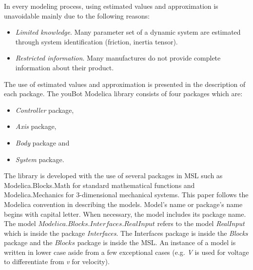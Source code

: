 In every modeling process, using estimated values and approximation is unavoidable mainly due to the following reasons:
\begin{itemize}
\item \emph{Limited knowledge}. 
Many parameter set of a dynamic system are estimated through system identification (friction, inertia tensor).
\item \emph{Restricted information}. 
Many manufactures do not provide complete information about their product.
\end{itemize}
The use of estimated values and approximation is presented in the description of each package.
The youBot Modelica library consists of four packages which are:
\begin{itemize} 
	\item \emph{Controller} package, 
	\item \emph{Axis} package, 
	\item \emph{Body} package and 
	\item \emph{System} package.
\end{itemize}
The library is developed with the use of several packages in MSL such as Modelica.Blocks.Math for standard mathematical functions and Modelica.Mechanics for 3-dimensional mechanical systems.
This paper follows the Modelica convention in describing the models.
Model's name or package's name begins with capital letter.
When necessary, the model includes its package name. 
The model $Modelica.Blocks.Interfaces.RealInput$ refers to the model \emph{RealInput} which is inside the package \emph{Interfaces}. 
The Interfaces package is inside the \emph{Blocks} package and the $Blocks$ package is inside the MSL.
An instance of a model is written in lower case aside from a few exceptional cases (e.g. \emph{V} is used for voltage to differentiate from \emph{v} for velocity).
